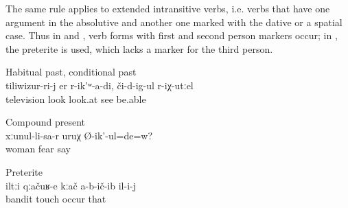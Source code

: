 The same rule applies to extended intransitive verbs, i.e. verbs that have one argument in the absolutive and another one marked with the dative or a spatial case. Thus in  and , verb forms with first and second person markers occur; in , the preterite is used, which lacks a marker for the third person.
%
\begin{exe}
		\ex	Habitual past, conditional past\\	\label{ex:‎I would watch TV if I were able to see habitual conditional past}
		\gll	tiliwizur-ri-j	er	r-ik'ʷ-a-di,	či-d-ig-ul	r-iχ-utːel\\
			television	look	look.at	see	be.able\\
		\glt	{}

		\ex	Compound present\\	\label{ex:Are you afraid of your wife compound present}
		\gll	xːunul-li-sa-r	uruχ	Ø-ik'-ul=de=w?\\
			woman	fear	say\\
		\glt	{}

		\ex	Preterite\\	\label{ex:‎‎‎The bandits did not touch him preterite}
		\gll	iltːi	qːačuʁ-e	kːač	a-b-ič-ib	il-i-j\\
				bandit	touch	occur	that\\
		\glt	{}
\end{exe}

